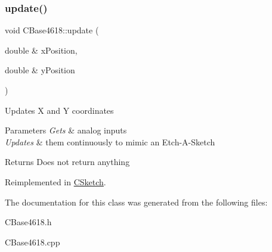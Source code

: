 \subsubsection{\texorpdfstring{update()}{update()}}
{\footnotesize\ttfamily void C\+Base4618\+::update (\begin{DoxyParamCaption}\item[{double \&}]{x\+Position,  }\item[{double \&}]{y\+Position }\end{DoxyParamCaption})\hspace{0.3cm}{\ttfamily [virtual]}}

Updates X and Y coordinates


\begin{DoxyParams}{Parameters}
{\em Gets} & analog inputs \\
\hline
{\em Updates} & them continuously to mimic an Etch-\/\+A-\/\+Sketch\\
\hline
\end{DoxyParams}
\begin{DoxyReturn}{Returns}
Does not return anything 
\end{DoxyReturn}


Reimplemented in \hyperlink{class_c_sketch_a81582a1c6eb7524db76546565412a88b}{C\+Sketch}.



The documentation for this class was generated from the following files\+:\begin{DoxyCompactItemize}
\item 
C\+Base4618.\+h\item 
C\+Base4618.\+cpp\end{DoxyCompactItemize}
